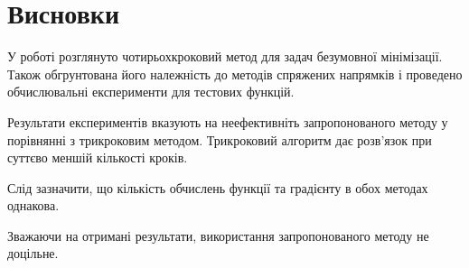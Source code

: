 \chapter*{Висновки}


У роботі розглянуто чотирьохкроковий метод для задач безумовної мінімізації. Також обгрунтована його належність до методів спряжених напрямків і проведено обчислювальні експерименти для тестових функцій.

Результати експериментів вказують на неефективніть запропонованого методу у порівнянні з трикроковим методом. Трикроковий алгоритм дає розв'язок при суттєво меншій кількості кроків.

Слід зазначити, що кількість обчислень функції та градієнту в обох методах однакова.

Зважаючи на отримані результати, використання запропонованого методу не доцільне.
